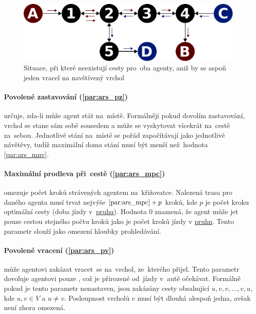 \begin{figure}[h]
	\centering
	\includegraphics[width=140mm]{../img/mnv_example}
	\caption{Situace, při které neexistují cesty pro~oba agenty, aniž by se aspoň jeden vracel na navštívený vrchol}
	\label{fig:ars_mnv_example}
\end{figure}

\paragraph{Povolené zastavování (\ref{par:ars_pz})}
určuje, zda-li může agent stát na~místě.
Formálněji pokud dovolím zastavování, vrchol se stane sám sobě sousedem a může se vyskytovat vícekrát na~cestě za~sebou.
Jednotlivé stání na~místě se pořád započítávají jako jednotlivé návštěvy,
tudíž maximální doma stání musí být menší než~hodnota \ref{par:ars_mnv}.

\paragraph{Maximální prodleva při~cestě (\ref{par:ars_mpc})}
omezuje počet kroků strávených agentem na~křižovatce.
Nalezená trasa pro daného agenta musí trvat nejvýše $\ref{par:ars_mpc} + p$ kroků,
kde $p$ je počet kroku optimální cesty (doba jízdy v~\hyperref[par:pruh]{pruhu}).
Hodnota $0$ znamená, že agent může jet pouze cestou stejného počtu kroků
jako je počet kroků jízdy v \hyperref[par:pruh]{pruhu}.
Tento parametr slouží jako omezení hloubky prohledávání.

\paragraph{Povolené vracení (\ref{par:ars_pv})}
může agentovi zakázat vracet~se na~vrchol, ze~kterého přijel.
Tento parametr dovoluje agentovi pouze , což je přirozené od~jízdy v~autě očekávat.
Formálně pokud je tento parametr nenastaven, jsou zakázány cesty obsahující $u,v,v,\dots,v,u$,
kde $u, v \in V$ a $u \neq v$.
Posloupnost vrcholů $v$ musí být dlouhá alespoň jedna, avšak není zhora omezená.

